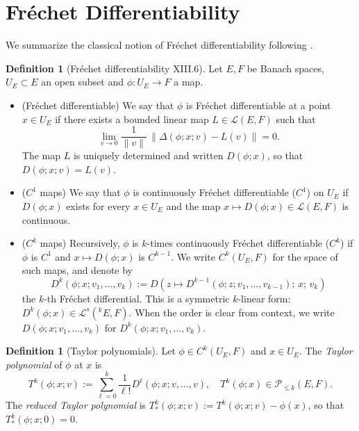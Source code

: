 \documentclass[10pt,a4paper]{article}
\theoremstyle{plain}
\theoremstyle{definition}
\newtheorem{definition}[theorem]{Definition}
\newcommand{\1}{\mathbb{1}} %
\newcommand{\ra}{\rightarrow} %
\newcommand{\KL}{\mathcal{L}}
\begin{document}
\section{Fréchet Differentiability}\label{fruxe9chet-differentiability}

We summarize the classical notion of Fréchet differentiability following
\citep{LangRFA}.

\begin{definition}[Fréchet differentiability \citep{LangRFA} XIII.6]

Let \(E,F\) be Banach spaces, \(U_E \subset E\) an open subset and
\(\phi:U_E \ra F\) a map.

\begin{itemize}
\item
  (Fréchet differentiable) We say that \(\phi\) is Fréchet
  differentiable at a point \(x \in U_E\) if there exists a bounded
  linear map \(L \in \KL(E,F)\) such that \[
      \lim_{v\to 0} \frac{1}{\|v\|}\, \|\Delta(\phi; x; v) - L(v)\| = 0.
    \] The map \(L\) is uniquely determined and written \(D(\phi; x)\),
  so that \(D(\phi; x; v) = L(v)\).
\item
  (\(C^1\) maps) We say that \(\phi\) is continuously Fréchet
  differentiable (\(C^1\)) on \(U_E\) if \(D(\phi; x)\) exists for every
  \(x \in U_E\) and the map \(x \mapsto D(\phi; x) \in \KL(E,F)\) is
  continuous.
\item
  (\(C^k\) maps) Recursively, \(\phi\) is \(k\)-times continuously
  Fréchet differentiable (\(C^k\)) if \(\phi\) is \(C^1\) and
  \(x \mapsto D(\phi; x)\) is \(C^{k-1}\). We write \(C^k(U_E, F)\) for
  the space of such maps, and denote by \[
      D^k(\phi; x; v_1,\dots,v_k) := D(z \mapsto D^{k-1}(\phi; z; v_1,\dots,v_{k-1});\, x;\, v_k)
    \] the \(k\)-th Fréchet differential. This is a symmetric
  \(k\)-linear form: \(D^k(\phi; x) \in \KL^s(^k E, F)\). When the order
  is clear from context, we write \(D(\phi; x; v_1,\dots,v_k)\) for
  \(D^k(\phi; x; v_1,\dots,v_k)\).
\end{itemize}

\end{definition}

\begin{definition}[Taylor polynomials]

\label{def:taylor} Let \(\phi \in C^k(U_E, F)\) and \(x \in U_E\). The
\emph{Taylor polynomial} of \(\phi\) at \(x\) is \[
  T^k(\phi; x; v) := \sum_{\ell=0}^k \frac{1}{\ell!} D^\ell(\phi; x; v,\dots,v), \quad T^k(\phi; x) \in \mathcal{P}_{\le k}(E, F).
\] The \emph{reduced Taylor polynomial} is
\(T_{\ast}^k(\phi; x; v) := T^k(\phi; x; v) - \phi(x)\), so that
\(T_{\ast}^k(\phi; x; 0) = 0\).

\end{definition}
\end{document}
